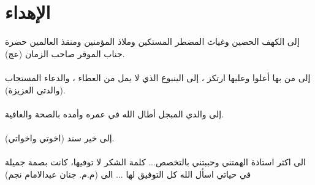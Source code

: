 \chapter*{الإهداء}
إلى الكهف الحصين وغياث المضطر المستكين وملاذ المؤمنين ومنقذ العالمين حضرة جناب الموقر صاحب الزمان (عج).\\
\\
إلى من بها أعلوا وعليها ارتكز ، إلى الينبوع الذي لا يمل من العطاء ، والدعاء المستجاب (والدتي العزيزة).\\
\\
إلى والدي المبجل أطال الله في عمره وأمده بالصحة والعافية.\\
\\
إلى خير سند (اخوتي واخواتي).\\
\\
الى اكثر استاذة الهمتني وحببتني بالتخصص... كلمة الشكر لا توفيها، كانت بصمة جميلة في حياتي اسأل الله كل التوفيق لها ... الى (م.م. جنان عبدالامام نجم)  
